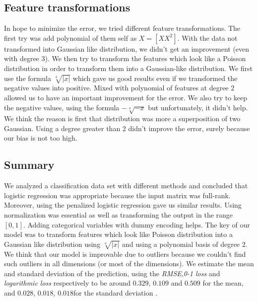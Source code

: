 \documentclass{article} %
\begin{document}
\subsection{Feature transformations}

In hope to minimize the error, we tried different feature transformations. The first try was add polynomial of them self as $X = [X X^2]$. With the data not transformed into Gaussian like distribution, we didn't get an improvement (even with degree 3). We then try to transform the features which look like a Poisson distribution in order to transform them into a Gaussian-like distribution. We first use the formula $\sqrt[4]{|x|}$ which gave us good results even if we transformed the negative values into positive. Mixed with polynomial of features at degree 2 allowed us to have an important improvement for the error. We also try to keep the negative values, using the formula $-\sqrt[4]{-x}$ but unfortunately, it didn't help. We think the reason is first that distribution was more a superposition of two Gaussian. Using a degree greater than 2 didn't improve the error, surely because our bias is not too high.

\subsection{Summary}

We analyzed a classification data set with different methods and concluded that logistic regression was appropriate because the input matrix was full-rank. Moreover, using the penalized logistic regression gave us similar results. Using normalization was essential as well as transforming the output in the range $[0,1]$. Adding categorical variables with dummy encoding helps. The key of our model was to transform features which look like Poisson distribution into a Gaussian like distribution using $\sqrt[4]{|x|}$ and using a polynomial basis of degree 2. We think that our model is improvable due to outliers because we couldn't find such outliers in all dimensions (or most of the dimensions). We estimate the mean and standard deviation of the prediction, using the \textit{RMSE},\textit{0-1 loss} and \textit{logarithmic loss} respectively to be around $0.329$, $0.109$ and $0.509$ for the mean, and $0.028$, $0.018$, $0.018$for the standard deviation .
\end{document}
